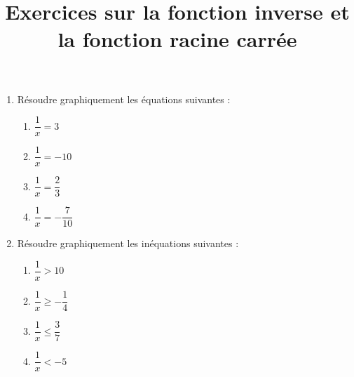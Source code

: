 \documentclass[a4paper]{article}
\begin{document}
\title{Exercices sur la fonction inverse et la fonction racine carrée}

\pagestyle{empty}

\date{}
\author{}

\maketitle{}
\thispagestyle{empty}

\exo \vspace{-2mm}

\begin{enumerate}
  \item Résoudre graphiquement les équations suivantes :
    \smallskip
    \begin{multicols}{4}
      \begin{enumerate}
	\item $\dfrac{1}{x}=3$
	\item $\dfrac{1}{x}=-10$	
	\item $\dfrac{1}{x}=\dfrac{2}{3}$
	\item $\dfrac{1}{x}=-\dfrac{7}{10}$
      \end{enumerate}
    \end{multicols}
    \smallskip
    \item Résoudre graphiquement les inéquations suivantes :
      \smallskip
    \begin{multicols}{4}
      \begin{enumerate}
	\item $\dfrac{1}{x}>10$	
	\item $\dfrac{1}{x}\geq -\dfrac{1}{4}$
	\item $\dfrac{1}{x}\leq \dfrac{3}{7}$
	\item $\dfrac{1}{x}< -5$
      \end{enumerate}
    \end{multicols}
\end{enumerate}

\bigskip

\exo \vspace{-2mm}
\end{document}
